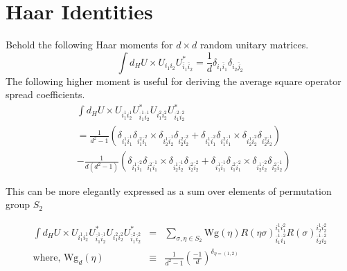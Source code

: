 \documentclass[aps,prb,twocolumn,superscriptaddress]{revtex4-1}
\begin{document}
\section{Haar Identities}
Behold the following Haar moments for $d\times d$ random unitary
matrices. 
\[
\int d_{H}U\times U_{i_{1}i_{2}}U_{\overline{i}_{1}\overline{i}_{2}}^{*}=\frac{1}{d}\delta_{i_{1}\overline{i}_{1}}\delta_{i_{2}\overline{j}_{2}}
\]
The following higher moment is useful for deriving the average square operator spread coefficients. 
\begin{align*}
& \int d_{H}U\times U_{i_{1}^{1}i_{2}^{1}}U_{\overline{i}_{1}^{1}\overline{i}_{2}^{1}}^{*}U_{i_{1}^{2}i_{2}^{2}}U_{\overline{i}_{1}^{2}\overline{i}_{2}^{2}}^{*} \\
& =\frac{1}{d^{2}-1}\left(\delta_{i_{1}^{1}\overline{i}_{1}^{1}}\delta_{i_{1}^{2}\overline{i}_{1}^{2}}\times\delta_{i_{2}^{1}\overline{i}_{2}^{1}}\delta_{i_{2}^{2}\overline{i}_{2}^{2}}+\delta_{i_{1}^{1}\overline{i}_{1}^{2}}\delta_{i_{1}^{2}\overline{i}_{1}^{1}}\times\delta_{i_{2}^{1}\overline{i}_{2}^{2}}\delta_{i_{2}^{2}\overline{i}_{2}^{1}}\right)\\
 & -\frac{1}{d(d^{2}-1)}\left(\delta_{i_{1}^{1}\overline{i}_{1}^{2}}\delta_{i_{1}^{2}\overline{i}_{1}^{1}}\times\delta_{i_{2}^{1}\overline{i}_{2}^{1}}\delta_{i_{2}^{2}\overline{i}_{2}^{2}}+\delta_{i_{1}^{1}\overline{i}_{1}^{1}}\delta_{i_{1}^{2}\overline{i}_{1}^{2}}\times\delta_{i_{2}^{1}\overline{i}_{2}^{2}}\delta_{i_{2}^{2}\overline{i}_{2}^{1}}\right)
\end{align*}


This can be more elegantly expressed as a sum over elements of permutation
group $S_{2}$

\begin{eqnarray}
\int d_{H}U\times U_{i_{1}^{1}i_{2}^{1}}U_{\overline{i}_{1}^{1}\overline{i}_{2}^{1}}^{*}U_{i_{1}^{2}i_{2}^{2}}U_{\overline{i}_{1}^{2}\overline{i}_{2}^{2}}^{*} & = & \sum_{\sigma,\eta\in S_{2}}\text{Wg}(\eta)R(\eta\sigma)_{\overline{i}_{1}^{1}\overline{i}_{1}^{2}}^{i_{1}^{1}i_{1}^{2}}R(\sigma)_{\overline{i}_{2}^{1}\overline{i}_{2}^{2}}^{i_{2}^{1}i_{2}^{2}}\nonumber\\
\text{where, }\text{Wg}_{d}(\eta) & \equiv & \frac{1}{d^{2}-1}\left(\frac{-1}{d}\right)^{\delta_{\eta=(1,2)}}\label{eq:Haaraverage}
\end{eqnarray}
\end{document}
